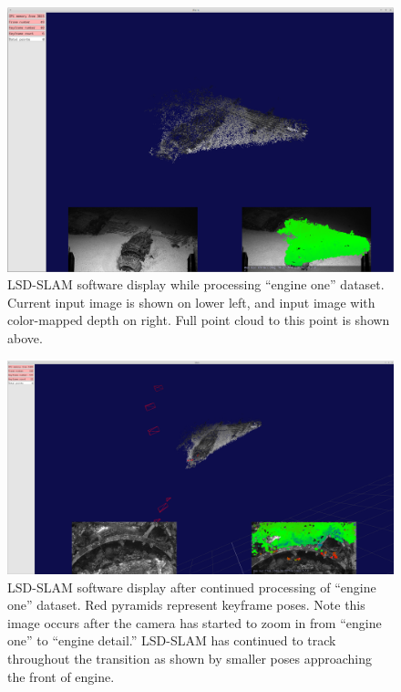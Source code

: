 \documentclass[letterpaper,12pt]{article}
\begin{document}
\begin{figure}
    \centering
    \includegraphics[width=\textwidth]{images/lsd_slam_engine_two.png}
    \caption{LSD-SLAM software display while processing ``engine one'' dataset.    Current input image is shown on lower left, and input image with color-mapped depth on right.   Full point cloud to this point is shown above.} 
    \label{fig:lsd_slam_engine}
\end{figure}

\begin{figure}
    \centering
    \includegraphics[width=\textwidth]{images/lsd_slam_engine.png}
    \caption{LSD-SLAM software display after continued processing of ``engine one'' dataset.  Red pyramids represent keyframe poses.   Note this image occurs after the camera has started to zoom in from ``engine one'' to ``engine detail.''  LSD-SLAM has continued to track throughout the transition as shown by smaller poses approaching the front of engine.}
    \label{fig:lsd_slam_engine_detail}
\end{figure}
\end{document}
